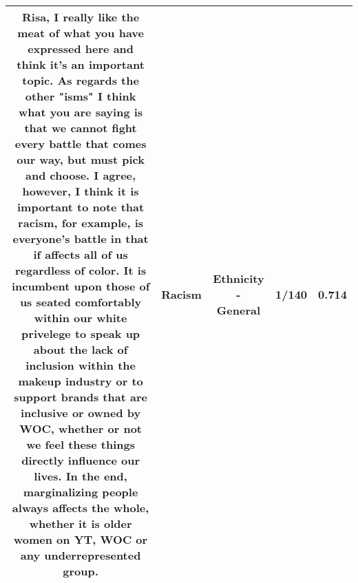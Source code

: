 \documentclass[11pt]{article}
\newlength\mylength
\begin{document}
\begin{center}
\begin{longtable}{|C{.65\mylength}|C{.30\mylength}|C{.12\mylength}|C{.12\mylength}|C{.12\mylength}|}
  \small Risa, I really like the meat of what you have expressed here and think it's an important topic. As regards the other "isms"  I think what you are saying is that we cannot fight every battle that comes our way, but must pick and choose.  I agree, however, I think it is important to note that \textbf{racism}, for example, is everyone's battle in that if affects all of us regardless of color.  It is incumbent upon those of us seated comfortably within our white privelege to speak up about the lack of inclusion within the makeup industry or to support brands that are inclusive or owned by WOC, whether or not we feel these things directly influence our lives.  In the end, marginalizing people always affects the whole, whether it is older women on YT, WOC or any underrepresented group.\normalsize   & Racism & Ethnicity - General & 1/140 & 0.714 \\  \hline

\end{longtable}
\end{center}
\end{document}
